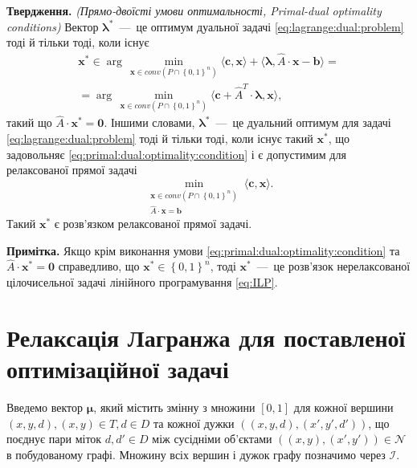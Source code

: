 \textbf{Твердження.}
\textit{(Прямо-двоїсті умови оптимальності, Primal-dual optimality conditions)}
Вектор $\pmb{\lambda}^*$~---~це оптимум дуальної задачі
\eqref{eq:lagrange:dual:problem} тоді й тільки тоді, коли існує
\begin{equation} \label{eq:primal:dual:optimality:condition}
\begin{gathered}
    \pmb{x}^* \in
    \arg\,\min \limits_{\pmb{x} \in conv \left( P \cap \left\{ 0, 1\right\}^n\right)}
        \langle \pmb{c}, \pmb{x} \rangle +
        \langle \pmb{\lambda}, \hat{A} \cdot \pmb{x} - \pmb{b} \rangle = \\
    = \arg\,\min \limits_{\pmb{x} \in conv \left( P \cap \left\{ 0, 1\right\}^n\right)}
        \langle \pmb{c} + \hat{A}^T \cdot \pmb{\lambda}, \pmb{x} \rangle,
\end{gathered}
\end{equation}
такий що $\hat{A} \cdot \pmb{x}^* = \pmb{0}$.
Іншими словами, $\pmb{\lambda}^*$~---~це дуальний оптимум для задачі
\eqref{eq:lagrange:dual:problem} тоді й тільки тоді,
коли існує такий $\pmb{x}^*$,
що задовольняє \eqref{eq:primal:dual:optimality:condition}
і є допустимим для релаксованої прямої задачі
\begin{equation*}
    \min \limits_{\substack{\pmb{x} \in conv \left( P \cap \left\{ 0, 1 \right\}^n\right) \\
                            \hat{A} \cdot \pmb{x} = \pmb{b}}}
        \langle \pmb{c}, \pmb{x} \rangle.
\end{equation*}
Такий $\pmb{x}^*$ є розв'язком релаксованої прямої задачі.

\textbf{Примітка.}
Якщо крім виконання умови \eqref{eq:primal:dual:optimality:condition} та
$\hat{A} \cdot \pmb{x}^* = \pmb{0}$ справедливо,
що $\pmb{x}^* \in \left\{ 0, 1 \right\}^n$,
тоді $\pmb{x}^*$~---~це розв'язок нерелаксованої
цілочисельної задачі лінійного програмування \eqref{eq:ILP}.

\section{Релаксація Лагранжа для поставленої оптимізаційної задачі}

Введемо вектор $\pmb{\mu}$, який містить змінну з множини $ \left[ 0, 1 \right]$
для кожної вершини
$\left( x, y, d \right), \left(x, y \right) \in T, d \in D$ та кожної дужки
$\left( \left( x, y, d \right), \left(x', y', d' \right) \right)$,
що поєднує пари міток $d, d' \in D$ між сусідніми об'єктами
$\left(\left(x, y \right), \left(x', y' \right) \right) \in \mathcal{N}$
в побудованому графі.
Множину всіх вершин і дужок графу позначимо через $\mathcal{I}$.

